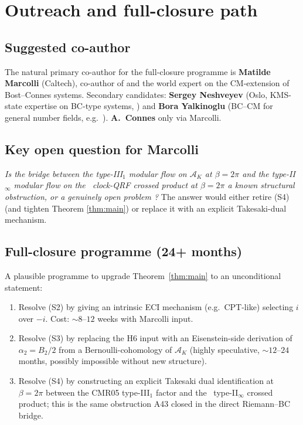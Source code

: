 \documentclass[12pt]{amsart}
\theoremstyle{definition}
\newcommand{\DEHK}{\mathrm{DEHK}}
\begin{document}
\section{Outreach and full-closure path}
\label{sec:future}

\subsection{Suggested co-author}
The natural primary co-author for the full-closure programme is
\textbf{Matilde Marcolli} (Caltech), co-author of \cite{CMR05} and
the world expert on the CM-extension of Bost--Connes systems.
Secondary candidates: \textbf{Sergey Neshveyev} (Oslo, KMS-state
expertise on BC-type systems, \cite{LLN07,LLN09}) and \textbf{Bora
Yalkinoglu} (BC--CM for general number fields, e.g.\
\cite{Yalkinoglu10}). \textbf{A.~Connes} only via Marcolli.

\subsection{Key open question for Marcolli}
\emph{Is the bridge between the type-III${}_1$ modular flow on
$\mathcal{A}_K$ at $\beta = 2\pi$ and the type-II${}_\infty$
modular flow on the \DEHK\ clock-QRF crossed product at $\beta =
2\pi$ a known structural obstruction, or a genuinely open problem
?} The answer would either retire (S4) (and tighten Theorem
\ref{thm:main}) or replace it with an explicit Takesaki-dual
mechanism.

\subsection{Full-closure programme (24+ months)}
A plausible programme to upgrade Theorem~\ref{thm:main} to an
unconditional statement:
\begin{enumerate}
\item Resolve (S2) by giving an intrinsic ECI mechanism (e.g.\
  CPT-like) selecting $i$ over $-i$. Cost: $\sim 8$--$12$ weeks
  with Marcolli input.
\item Resolve (S3) by replacing the H6 input with an
  Eisenstein-side derivation of $\alpha_2 = B_2/2$ from a
  Bernoulli-cohomology of $\mathcal{A}_K$ (highly speculative,
  $\sim 12$--$24$ months, possibly impossible without new
  structure).
\item Resolve (S4) by constructing an explicit Takesaki dual
  identification at $\beta = 2\pi$ between the CMR05 type-III${}_1$
  factor and the \DEHK\ type-II${}_\infty$ crossed product; this
  is the same obstruction A43 closed in the direct
  Riemann--BC bridge.
\end{enumerate}
\end{document}
